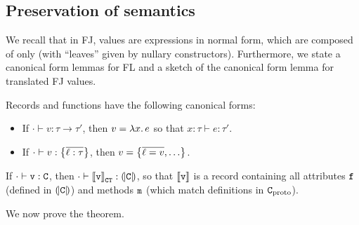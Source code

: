 \vfill
\subsection{Preservation of semantics}

We recall that in FJ, values are expressions in normal form, which are composed of only  (with \enquote{leaves} given by nullary constructors).
Furthermore, we state a canonical form lemmas for FL and a sketch of the canonical form lemma for translated FJ values.
\begin{lemma}
    Records and functions have the following canonical forms:
    \begin{itemize}
        \item If $\cdot \vdash v : \tau \to \tau'$, then $v = \lambda x \ldotp e$ so that $x : \tau \vdash e : \tau'$.
        \item If $\cdot \vdash v : \flrec{\overline{\ell : \tau}}$, then $v = \flrec{\overline{\ell = v}, \dots}$.
    \end{itemize}
\end{lemma}
\begin{lemma}
    If $\cdot \vdash \texttt{v} : \texttt{C}$, then $\cdot \vdash \denot{\fj v}_{\fj{CT}} : \denoty{\fj{C}}$, so that $\denot{\fj v}$ is a record containing all attributes $\texttt{f}$ (defined in $\denoty{\fj C}$) and methods $\texttt{m}$ (which match definitions in $\texttt{C}_\mathrm{proto}$).
\end{lemma}
We now prove the theorem.

